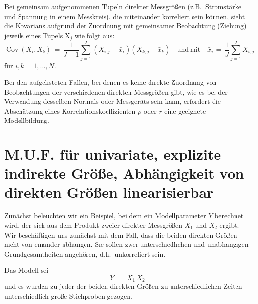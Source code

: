 Bei gemeinsam aufgenommenen Tupeln direkter Messgrößen (z.B.\ Stromstärke und Spannung in
einem Messkreis), die miteinander korreliert sein können, sieht die Kovarianz aufgrund
der Zuordnung mit gemeinsamer Beobachtung (Ziehung) jeweils eines Tupels $\mathrm{X}_j$ wie folgt aus:
$$
\operatorname{Cov}(X_i, X_k) \, = \,
\frac{1}{J-1} \sum_{j=1}^J (X_{i,j} - \bar x_i) (X_{k,j} - \bar x_k)
 \quad \mathrm{und~mit}
\quad  \bar x_i \, = \, \frac{1}{J} \sum_{j=1}^J X_{i,j}
$$
für $i,k = 1,\dots, N$.

Bei den aufgelisteten Fällen, bei denen es keine direkte Zuordnung von Beobachtungen
der verschiedenen direkten Messgrößen gibt, wie es bei der Verwendung desselben Normals oder
Messgeräts sein kann, erfordert die Abschätzung eines Korrelationskoeffizienten
$\rho$ oder $r$ eine geeignete Modellbildung.


\section{M.U.F. für univariate, explizite indirekte Größe, Abhängigkeit von direkten Größen linearisierbar}

Zunächst beleuchten wir ein Beispiel, bei dem ein Modellparameter $Y$ berechnet wird,
der sich aus dem Produkt zweier direkter
Messgrößen $X_1$ und $X_2$ ergibt. Wir beschäftigen uns zunächst mit dem Fall, dass
die beiden direkten Größen nicht von einander abhängen. Sie sollen zwei unterschiedlichen
und unabhängigen Grundgesamtheiten angehören, d.h.\ unkorreliert sein.

Das Modell sei
\begin{equation}
Y \; = \; X_1 \, X_2
\label{BeispielProdukt2Gr}
\end{equation}
und es wurden zu jeder der beiden direkten Größen zu unterschiedlichen Zeiten unterschiedlich
große Stichproben gezogen.

